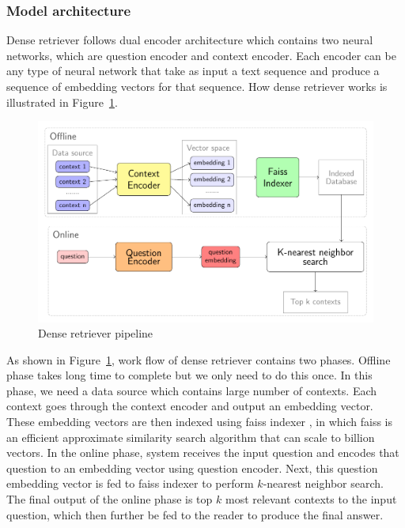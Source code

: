 \documentclass[12pt, sort&compress]{report}
\begin{document}
\subsubsection{Model architecture}
Dense retriever follows dual encoder architecture which contains two neural networks, which are question encoder and context encoder. Each encoder can be any type of neural network that take as input a text sequence and produce a sequence of embedding vectors for that sequence. How dense retriever works is illustrated in Figure~\ref{fig:04}.
\begin{figure}[!htbp]
	\centering
	\includegraphics[scale=.8]{images/PDF/biencoder/biencoder.pdf}
	\caption{Dense retriever pipeline}
	\label{fig:04}
\end{figure}
\par As shown in Figure~\ref{fig:04}, work flow of dense retriever contains two phases. Offline phase takes long time to complete but we only need to do this once. In this phase, we need a data source which contains large number of contexts. Each context goes through the context encoder and output an embedding vector. These embedding vectors are then indexed using faiss indexer \cite{JDH17}, in which faiss is an efficient approximate similarity search algorithm that can scale to billion vectors. In the online phase, system receives the input question and encodes that question to an embedding vector using question encoder. Next, this question embedding vector is fed to faiss indexer to perform $k$-nearest neighbor search. The final output of the online phase is top $k$ most relevant contexts to the input question, which then further be fed to the reader to produce the final answer.
\end{document}
